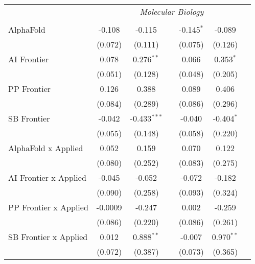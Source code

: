 \begin{tabular}{lcccccc}
 & \multicolumn{6}{c}{\textit{Molecular Biology}} \\ \\
   AlphaFold                      & -0.108  & -0.115         &               & -0.145$^{*}$ & -0.089       &   \\   
                                  & (0.072) & (0.111)        &               & (0.075)      & (0.126)      &   \\   
   AI Frontier                    & 0.078   & 0.276$^{**}$   &               & 0.066        & 0.353$^{*}$  &   \\   
                                  & (0.051) & (0.128)        &               & (0.048)      & (0.205)      &   \\   
   PP Frontier                    & 0.126   & 0.388          &               & 0.089        & 0.406        &   \\   
                                  & (0.084) & (0.289)        &               & (0.086)      & (0.296)      &   \\   
   SB Frontier                    & -0.042  & -0.433$^{***}$ &               & -0.040       & -0.404$^{*}$ &   \\   
                                  & (0.055) & (0.148)        &               & (0.058)      & (0.220)      &   \\   
   AlphaFold x Applied            & 0.052   & 0.159          &               & 0.070        & 0.122        &   \\   
                                  & (0.080) & (0.252)        &               & (0.083)      & (0.275)      &   \\   
   AI Frontier x Applied          & -0.045  & -0.052         &               & -0.072       & -0.182       &   \\   
                                  & (0.090) & (0.258)        &               & (0.093)      & (0.324)      &   \\   
   PP Frontier x Applied          & -0.0009 & -0.247         &               & 0.002        & -0.259       &   \\   
                                  & (0.086) & (0.220)        &               & (0.086)      & (0.261)      &   \\   
   SB Frontier x Applied          & 0.012   & 0.888$^{**}$   &               & -0.007       & 0.970$^{**}$ &   \\   
                                  & (0.072) & (0.387)        &               & (0.073)      & (0.365)      &   \\   

\end{tabular}
